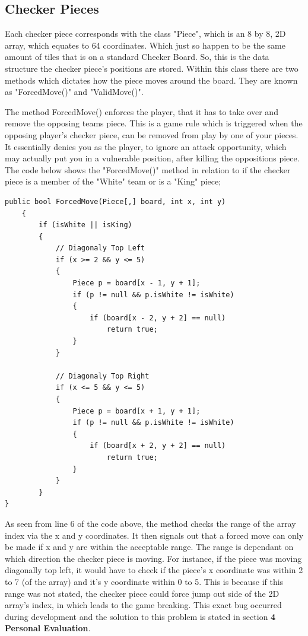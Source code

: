 \documentclass[10pt, a4paper]{article}
\begin{document}
	\subsection{Checker Pieces}
	Each checker piece corresponds with the class "Piece", which is an 8 by 8, 2D array, which equates to 64 coordinates. Which just so happen to be the same amount of tiles that is on a standard Checker Board. So, this is the data structure the checker piece's positions are stored. Within this class there are two methods which dictates how the piece moves around the board. They are known as "ForcedMove()" and "ValidMove()".
	
	The method ForcedMove() enforces the player, that it has to take over and remove the opposing teams piece. This is a game rule which is triggered when the opposing player's checker piece, can be removed from play by one of your pieces. It essentially denies you as the player, to ignore an attack opportunity, which may actually put you in a vulnerable position, after killing the oppositions piece. The code below shows the "ForcedMove()" method in relation to if the checker piece is a member of the "White" team or is a "King" piece;
	\begin{lstlisting}[caption = ForcedMove()]
public bool ForcedMove(Piece[,] board, int x, int y)
    {
        if (isWhite || isKing)
        {
            // Diagonaly Top Left
            if (x >= 2 && y <= 5)
            {
                Piece p = board[x - 1, y + 1];
                if (p != null && p.isWhite != isWhite)
                {
                    if (board[x - 2, y + 2] == null)
                        return true;
                }
            }
            
            // Diagonaly Top Right
            if (x <= 5 && y <= 5)
            {
                Piece p = board[x + 1, y + 1];
                if (p != null && p.isWhite != isWhite)
                {
                    if (board[x + 2, y + 2] == null)
                        return true;
                }
            }
        }
}
	\end{lstlisting}
	
	As seen from line 6 of the code above, the method checks the range of the array index via the x and y coordinates. It then signals out that a forced move can only be made if x and y are within the acceptable range. The range is dependant on which direction the checker piece is moving. For instance, if the piece was moving diagonally top left, it would have to check if the piece's x coordinate was within 2 to 7 (of the array) and it's y coordinate within 0 to 5. This is because if this range was not stated, the checker piece could force jump out side of the 2D array's index, in which leads to the game breaking. This exact bug occurred during development and the solution to this problem is stated in section \textbf{4 Personal Evaluation}. 
	
\end{document}
